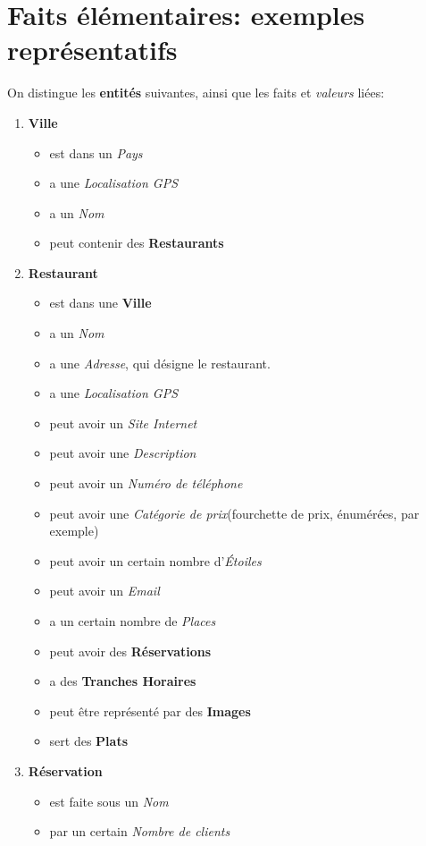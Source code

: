 \documentclass[10pt,a4paper]{article}
\begin{document}
\section{Faits élémentaires: exemples représentatifs}
On distingue les \textbf{entités} suivantes, ainsi que les faits et \textit{valeurs} liées:
\begin{enumerate}
\item \textbf{Ville}
	\begin{itemize}
		\item est dans un \textit{Pays}
		\item a une \textit{Localisation GPS}
		\item a un \textit{Nom}
		\item peut contenir des \textbf{Restaurants}
	\end{itemize}
\item \textbf{Restaurant}
	\begin{itemize}
		\item est dans une \textbf{Ville}
		\item a un \textit{Nom}
		\item a une \textit{Adresse}, qui désigne le restaurant.
		\item a une \textit{Localisation GPS}
		\item peut avoir un \textit{Site Internet}
		\item peut avoir une \textit{Description}
		\item peut avoir un \textit{Numéro de téléphone}
		\item peut avoir une \textit{Catégorie de prix}(fourchette de prix, énumérées, par exemple)
		\item peut avoir un certain nombre d'\textit{Étoiles}
		\item peut avoir un \textit{Email}
		\item a un certain nombre de \textit{Places}
		\item peut avoir des \textbf{Réservations}
		\item a des \textbf{Tranches Horaires}
		\item peut être représenté par des \textbf{Images}
		\item sert des \textbf{Plats}
	\end{itemize}
\item \textbf{Réservation}
	\begin{itemize}
		\item est faite sous un \textit{Nom}
		\item par un certain \textit{Nombre de clients}

\end{itemize}
\end{enumerate}
\end{document}
